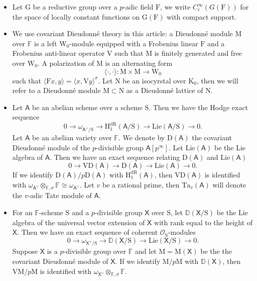 \documentclass[10pt]{amsart}
\numberwithin{equation}{section}
\theoremstyle{definition}
\def\Lie{\mathrm{Lie}}
\def\calO{\mathcal{O}}
\def\bfB{\mathbf{B}}
\def\DD{\mathbb{D}}
\def\FF{\mathbb{F}}
\def\bfG{\mathbf{G}}
\def\bfT{\mathbf{T}}
\def\sfX{\mathsf{X}}
\def\ZZ{\mathbb{Z}}
\def\bfU{\mathbf{U}}
\def\rmc{\mathrm{c}}
\def\sfA{\mathsf{A}}
\def\rmD{\mathrm{D}}
\def\rmF{\mathrm{F}}
\def\rmG{\mathrm{G}}
\def\rmH{\mathrm{H}}
\def\rmK{\mathrm{K}}
\def\rmM{\mathrm{M}}
\def\rmN{\mathrm{N}}
\def\rmV{\mathrm{V}}
\def\rmW{\mathrm{W}}
\def\rmS{\mathrm{S}}
\begin{document}
\begin{itemize}

\item Let $\rmG$ be a reductive group over a $p$-adic field $\rmF$, we write $C^{\infty}_{\rmc}(G(\rmF))$ for the space of locally constant functions on $\rmG(\rmF)$ with compact support. 

\item We use covariant Dieudonn\'e theory in this article: a Dieudonn\'e module $\rmM$ over $\FF$ is a left $\rmW_{0}$-module equipped with a Frobenius linear $\rmF$ and a Frobenius anti-linear operator $\rmV$ such that $\rmM$ is finitely generated and free over $\rmW_{0}$. A polarization of $\rmM$ is an alternating form
\begin{equation*}
\langle\cdot,\cdot\rangle:\rmM\times\rmM\rightarrow \rmW_{0}
\end{equation*}
such that $\langle \rmF x, y\rangle=\langle x, \rmV y\rangle^{\sigma}$. Let $\rmN$ be an isocyrstal over $\rmK_{0}$, then we will refer to a Dieudonn\'e module $\rmM\subset \rmN$ as a Dieudonn\'e  lattice of $\rmN$.
\item Let $\sfA$ be an abelian scheme over a scheme $\rmS$. Then we have the Hodge exact sequence
\begin{equation*}
0\rightarrow\omega_{\sfA^{\vee}/\rmS}\rightarrow \rmH^{\mathrm{dR}}_{1}(\sfA/\rmS)\rightarrow \Lie(\sfA/\rmS)\rightarrow 0.
\end{equation*}
Let $\sfA$ be an abelian variety over $\FF$. We denote by $\rmD(\sfA)$ the covariant Dieudonn\'e module of the $p$-divisible group $\sfA[p^{\infty}]$.  Let $\Lie(\sfA)$ be the Lie algebra of $\sfA$. Then we have an exact sequence relating $\rmD(\sfA)$ and $\Lie(\sfA)$
\begin{equation*}
0\rightarrow \rmV\rmD(\sfA)\rightarrow \rmD(\sfA)\rightarrow \Lie(\sfA)\rightarrow 0.
\end{equation*}
If we identify $\rmD(\sfA)/p\rmD(\sfA)$ with $\rmH^{\mathrm{dR}}_{1}(\sfA)$, then $\rmV\rmD(\sfA)$ is identified with $\omega_{\sfA^{\vee}}\otimes_{\FF,\sigma}\FF\cong \omega_{\sfA^{\vee}}$.
Let $v$ be a rational prime, then $\mathrm{Ta}_{v}(\sfA)$ will denote the $v$-adic Tate module of $\sfA$.

\item For an $\FF$-scheme $\rmS$ and a $p$-divisible group $\sfX$ over $\rmS$, let $\DD(\sfX/\rmS)$ be the Lie algebra of the universal vector extension of $\sfX$ with rank equal to the height of $\sfX$. Then we have an exact sequence of coherent $\calO_{\rmS}$-modules
\begin{equation*}
0\rightarrow\omega_{\sfX^{\vee}/\rmS}\rightarrow \DD(\sfX/\rmS)\rightarrow \Lie(\sfX/\rmS)\rightarrow 0.
\end{equation*}
Suppose $\sfX$ is a $p$-divisible group over $\FF$ and let $\rmM=\rmM(\sfX)$ be the the covariant Dieudonn\'e module of $\sfX$. If we identify $\rmM/p\rmM$ with $\DD(\sfX)$, then $\rmV\rmM/p\rmM$ is identified with $\omega_{\sfX^{\vee}}\otimes_{\FF,\sigma}\FF$.

\end{itemize}
\end{document}

